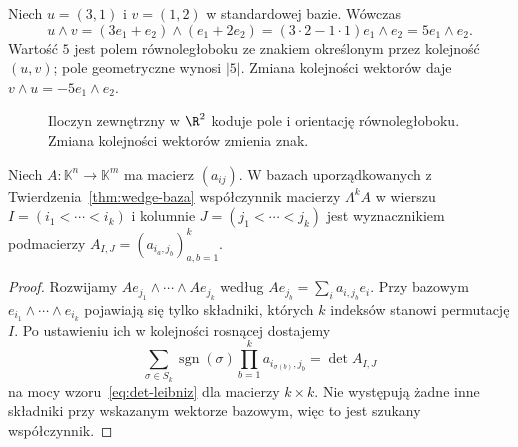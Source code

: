 \begin{przyklad}
Niech $u=(3,1)$ i $v=(1,2)$ w standardowej bazie.
Wówczas
\[
 u\wedge v=(3e_1+e_2)\wedge(e_1+2e_2)
 =(3\cdot2-1\cdot1)e_1\wedge e_2
 =5e_1\wedge e_2.
\]
Wartość $5$ jest polem równoległoboku ze znakiem określonym
przez kolejność $(u,v)$; pole geometryczne wynosi $|5|$.
Zmiana kolejności wektorów daje $v\wedge u=-5e_1\wedge e_2$.
\end{przyklad}

\begin{figure}[H]
\centering
{}
\caption{Iloczyn zewnętrzny w $\R^2$ koduje pole i orientację
równoległoboku. Zmiana kolejności wektorów zmienia znak.}
\label{fig:wedge-pole}
\end{figure}

\begin{twierdzenie}
\label{thm:minory-lambda}
Niech $A\colon\mathbb K^n\to\mathbb K^m$ ma macierz
$(a_{ij})$. W bazach uporządkowanych z
Twierdzenia~\ref{thm:wedge-baza} współczynnik macierzy
$\Lambda^k A$ w wierszu $I=(i_1<\cdots<i_k)$ i kolumnie
$J=(j_1<\cdots<j_k)$ jest wyznacznikiem podmacierzy
$A_{I,J}=(a_{i_a,j_b})_{a,b=1}^k$.
\end{twierdzenie}
\begin{proof}
Rozwijamy
$Ae_{j_1}\wedge\cdots\wedge Ae_{j_k}$ według
$Ae_{j_b}=\sum_i a_{i,j_b}e_i$. Przy bazowym
$e_{i_1}\wedge\cdots\wedge e_{i_k}$ pojawiają się tylko
składniki, których $k$ indeksów stanowi permutację $I$.
Po ustawieniu ich w kolejności rosnącej dostajemy
\[
 \sum_{\sigma\in S_k}\operatorname{sgn}(\sigma)
 \prod_{b=1}^k a_{i_{\sigma(b)},j_b}
 =\det A_{I,J}
\]
na mocy wzoru~\eqref{eq:det-leibniz} dla macierzy $k\times k$.
Nie występują żadne inne składniki przy wskazanym
wektorze bazowym, więc to jest szukany współczynnik.
\end{proof}

